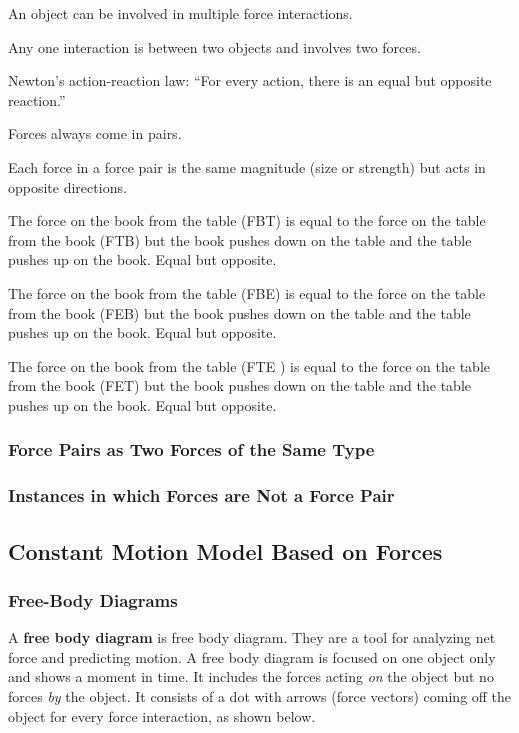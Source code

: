 \documentclass[dvipsnames]{article}
\begin{document}
An object can be involved in multiple force interactions.

Any one interaction is between two objects and involves two forces.

Newton's action-reaction law: ``For every action, there is an equal but opposite reaction.''

Forces always come in pairs.

Each force in a force pair is the same magnitude (size or strength) but acts in opposite directions.

The force on the book from the table (FBT) is equal  to the force on the table from the book (FTB) but the book pushes down on the table and the table pushes up on the book. Equal but opposite.

The force on the book from the table (FBE) is equal  to the force on the table from the book (FEB) but the book pushes down on the table and the table pushes up on the book. Equal but opposite.

The force on the book from the table (FTE ) is equal  to the force on the table from the book (FET) but the book pushes down on the table and the table pushes up on the book. Equal but opposite.

\subsubsection{Force Pairs as Two Forces of the Same Type}

\subsubsection{Instances in which Forces are Not a Force Pair}

\subsection{Constant Motion Model Based on Forces}

\subsubsection{Free-Body Diagrams}

A \textbf{\gls{free body diagram}} is \glsdesc{free body diagram}. They are a tool for analyzing net force and predicting motion. A free body diagram is focused on one object only and shows a moment in time. It includes the forces acting \textit{on} the object but no forces \textit{by} the object. It consists of a dot with arrows (force vectors) coming off the object for every force interaction, as shown below.
\end{document}
